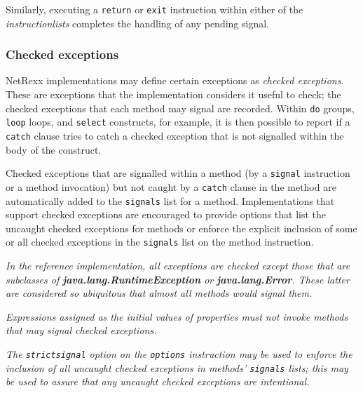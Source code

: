 Similarly, executing a \texttt{return}
or \texttt{exit} instruction within either of the
\emph{instructionlists} completes the handling of any pending
signal.
\subsubsection{Checked exceptions}\label{"id"}
 
NetRexx implementations may define certain exceptions as \emph{checked
exceptions}.  These are exceptions that the implementation considers
it useful to check; the checked exceptions that each method may signal
are recorded.  Within \texttt{do} groups, \texttt{loop} loops, and
\texttt{select} constructs, for example, it is then possible to report
if a \texttt{catch} clause tries to catch a checked exception that is
not signalled within the body of the construct.
 
Checked exceptions that are signalled within a method (by a
\texttt{signal} instruction or a method invocation) but not caught by a
\texttt{catch} clause in the method are automatically added to the
\texttt{signals} list for a method.  Implementations that support
checked exceptions are encouraged to provide options that list the
uncaught checked exceptions for methods or enforce the explicit
inclusion of some or all checked exceptions in the \texttt{signals} list
on the method instruction.
 
\emph{In the reference implementation, all exceptions are checked except
those that are subclasses of \textbf{java.lang.RuntimeException}
or \textbf{java.lang.Error}.  These latter are considered so
ubiquitous that almost all methods would signal them.}
 
\emph{Expressions assigned as the initial values of properties must not invoke
methods that may signal checked exceptions.}
 
\emph{The \texttt{strictsignal} option on the \texttt{options} instruction may
be used to enforce the inclusion of all uncaught checked exceptions in
methods' \texttt{signals} lists; this may be used to assure that
any uncaught checked exceptions are intentional.}

